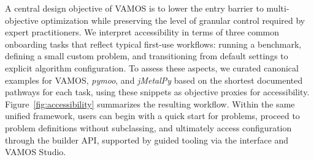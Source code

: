 \documentclass[final,5p,times,twocolumn]{elsarticle}
\newcommand{\VAMOS}{VAMOS}
\begin{document}
A central design objective of \VAMOS{} is to lower the entry barrier to multi-objective optimization while preserving the level of granular control required by expert practitioners. We interpret accessibility in terms of three common onboarding tasks that reflect typical first-use workflows: running a  benchmark, defining a small custom problem, and transitioning from default settings to explicit algorithm configuration. To assess these aspects, we curated canonical examples for \VAMOS{}, \textit{pymoo}, and \textit{jMetalPy} based on the shortest documented pathways for each task, using these snippets as objective proxies for accessibility. Figure~\ref{fig:accessibility} summarizes the resulting  workflow. Within the same unified framework, users can begin with a  quick start for  problems, proceed to  problem definitions without subclassing, and ultimately access  configuration through the builder API, supported by guided tooling via the  interface and \VAMOS{} Studio.

\end{document}
